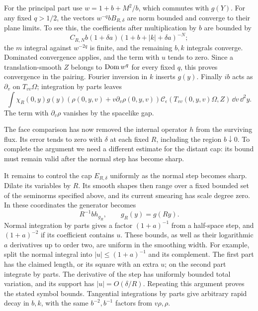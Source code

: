 For the principal part use $w=1+b+M^2/b$, which commutes with
$g(Y)$.  For any fixed $q>1/2$, the vectors
$w^{-q}bB_{R,\delta}$ are norm bounded and converge to their plane
limits.  To see this, the coefficients after multiplication by $b$
are bounded by
\[
 C_{R,N}b(1+\delta a)(1+b+|k|+\delta a)^{-N};
\]
the $m$ integral against $w^{-2q}$ is finite, and the remaining
$b,k$ integrals converge.  Dominated convergence applies, and the
term with $u$ tends to zero.  Since a translation-smooth $Z$ belongs
to $\operatorname{Dom} w^q$ for every fixed $q$, this proves convergence in the
pairing.  Fourier inversion in $k$ inserts $g(y)$.  Finally $ib$
acts as $\partial_v$ on $T_{vv}\Omega$; integration by parts leaves
\begin{equation}\label{N:plane-before-gap}
 \int\chi_R(0,y)g(y)
   (\rho(0,y,v)+v\partial_v\rho(0,y,v))
   \mathcal C_\epsilon(T_{vv}(0,y,v)\Omega,Z)\,\dd v\,\dd^2y.
\end{equation}
The term with $\partial_v\rho$ vanishes by the spacelike gap.

The face comparison has now removed the internal operator $h$ from
the surviving flux. Its error tends to zero with $\delta$ at each
fixed $R$, including the region $b\downarrow0$. To complete the
argument we need a different estimate for the distant cap: its
bound must remain valid after the normal step has become sharp.

It remains to control the cap $E_{R,\delta}$ uniformly as the normal
step becomes sharp.  Dilate its variables by $R$.  Its smooth shapes
then range over a fixed bounded set of the seminorms specified above,
and its current smearing has scale degree zero.  In these coordinates
the generator becomes
\begin{equation}\label{N:rescaled-generator}
 R^{-1}b h_{g_R},\qquad g_R(y)=g(Ry).
\end{equation}
Normal integration by parts gives a factor $(1+a)^{-1}$ from a
half-space step, and $(1+a)^{-2}$ if its coefficient contains $u$.
These bounds, as well as their logarithmic $a$ derivatives up to
order two, are uniform in the smoothing width.  For example, split
the normal integral into $|u|\leq(1+a)^{-1}$ and its complement.
The first part has the claimed length, or its square with an extra
$u$; on the second part integrate by parts.  The derivative of the
step has uniformly bounded total variation, and its support has
$|u|=O(\delta/R)$.  Repeating this argument proves the stated symbol
bounds.  Tangential integrations by parts give arbitrary rapid
decay in $b,k$, with the same $b^{-2},b^{-1}$ factors from $v\rho,\rho$.

